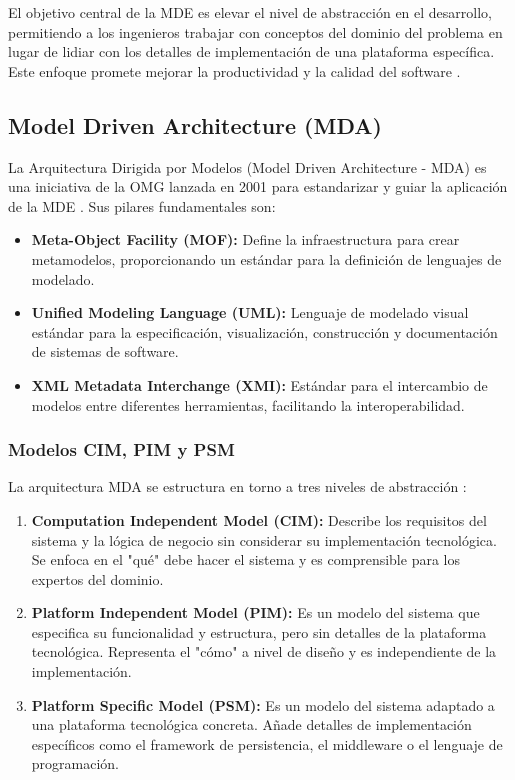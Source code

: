 \documentclass[12pt,a4paper]{article}
\begin{document}
El objetivo central de la MDE es elevar el nivel de abstracción en el desarrollo, permitiendo a los ingenieros trabajar con conceptos del dominio del problema en lugar de lidiar con los detalles de implementación de una plataforma específica. Este enfoque promete mejorar la productividad y la calidad del software \cite{pohl2025}.

\subsection{Model Driven Architecture (MDA)}

La Arquitectura Dirigida por Modelos (Model Driven Architecture - MDA) es una iniciativa de la OMG lanzada en 2001 para estandarizar y guiar la aplicación de la MDE \cite{omg2014}. Sus pilares fundamentales son:

\begin{itemize}
    \item \textbf{Meta-Object Facility (MOF):} Define la infraestructura para crear metamodelos, proporcionando un estándar para la definición de lenguajes de modelado.
    \item \textbf{Unified Modeling Language (UML):} Lenguaje de modelado visual estándar para la especificación, visualización, construcción y documentación de sistemas de software.
    \item \textbf{XML Metadata Interchange (XMI):} Estándar para el intercambio de modelos entre diferentes herramientas, facilitando la interoperabilidad.
\end{itemize}

\subsubsection{Modelos CIM, PIM y PSM}

La arquitectura MDA se estructura en torno a tres niveles de abstracción \cite{omg2014}:

\begin{enumerate}
    \item \textbf{Computation Independent Model (CIM):} Describe los requisitos del sistema y la lógica de negocio sin considerar su implementación tecnológica. Se enfoca en el "qué" debe hacer el sistema y es comprensible para los expertos del dominio.
    \item \textbf{Platform Independent Model (PIM):} Es un modelo del sistema que especifica su funcionalidad y estructura, pero sin detalles de la plataforma tecnológica. Representa el "cómo" a nivel de diseño y es independiente de la implementación.
    \item \textbf{Platform Specific Model (PSM):} Es un modelo del sistema adaptado a una plataforma tecnológica concreta. Añade detalles de implementación específicos como el framework de persistencia, el middleware o el lenguaje de programación.
\end{enumerate}
\end{document}
